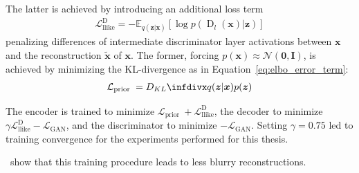 The latter is achieved by introducing an additional loss term
\begin{align}
    \mathcal{L}_{\text {llike}}^{\text {D}}=-\mathbb{E}_{q(\bm{z} | \bm{x})}\left[\log p\left(\operatorname{D}_{l}(\bm{x}) | \bm{z}\right)\right]
\end{align}
penalizing differences of intermediate discriminator layer activations between $\bm{x}$ and the reconstruction $\tilde{\bm{x}}$ of $\bm{x}$.
The former, forcing $p(\bm{x}) \approx \mathcal{N}(\bm{0},\bm{I})$, is achieved by minimizing the \ac{KL}-divergence as in Equation~\ref{eq:elbo_error_term}:
\begin{align}
    \mathcal{L}_{\text {prior }}=\kldiv{q(\boldsymbol{z} | \boldsymbol{x})}{p(\boldsymbol{z})}
\end{align}

The encoder is trained to minimize $\mathcal{L}_{\text {prior }} +  \mathcal{L}_{\text {llike}}^{\text {D}}$, the decoder to minimize $\gamma \mathcal{L}_{\text {llike}}^{\text {D}} - \mathcal{L}_\mathrm{GAN}$, and the discriminator to minimize $-\mathcal{L}_\mathrm{GAN}$.
Setting $\gamma = 0.75$ led to training convergence for the experiments performed for this thesis.

\citet{larsen2015autoencoding}~show that this training procedure leads to less blurry reconstructions.

